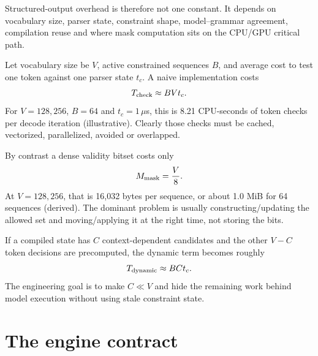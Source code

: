 Structured-output overhead is therefore not one constant. It depends on vocabulary
size, parser state, constraint shape, model--grammar agreement, compilation reuse and
where mask computation sits on the CPU/GPU critical path.



Let vocabulary size be $V$, active constrained sequences $B$, and average cost to test
one token against one parser state $t_c$. A naive implementation costs
\begin{equation}
T_{\rm check}\approx B V t_c.
\label{eq:structured-naive}
\end{equation}
For $V=128{,}256$, $B=64$ and $t_c=1\,\mu$s, this is 8.21 CPU-seconds of token checks
per decode iteration (illustrative). Clearly those checks must be cached, vectorized,
parallelized, avoided or overlapped.

By contrast a dense validity bitset costs only
\[
M_{\rm mask}=\frac{V}{8}.
\]
At $V=128{,}256$, that is 16,032 bytes per sequence, or about 1.0 MiB for 64 sequences
(derived). The dominant problem is usually constructing/updating the allowed set and
moving/applying it at the right time, not storing the bits.

If a compiled state has $C$ context-dependent candidates and the other $V-C$ token
decisions are precomputed, the dynamic term becomes roughly
\[
T_{\rm dynamic}\approx B C t_c.
\]
The engineering goal is to make $C\ll V$ and hide the remaining work behind model
execution without using stale constraint state.

\section{The engine contract}

